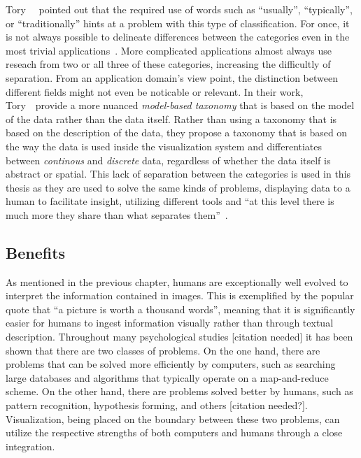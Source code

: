 \noindent Tory~\etal~\cite{tory2002model} pointed out that the required use of words such as ``usually'', ``typically'', or ``traditionally'' hints at a problem with this type of classification.  For once, it is not always possible to delineate differences between the categories even in the most trivial applications~\cite{rhyne2003information, weiskopf2006scivis}.  More complicated applications almost always use reseach from two or all three of these categories, increasing the difficultly of separation.  From an application domain's view point, the distinction between different fields might not even be noticable or relevant.  In their work, Tory~\etal~provide a more nuanced \emph{model-based taxonomy} that is based on the model of the data rather than the data itself.  Rather than using a taxonomy that is based on the description of the data, they propose a taxonomy that is based on the way the data is used inside the visualization system and differentiates between \emph{continous} and \emph{discrete} data, regardless of whether the data itself is abstract or spatial.  This lack of separation between the categories is used in this thesis as they are used to solve the same kinds of problems, displaying data to a human to facilitate insight, utilizing different tools and ``at this level there is much more they share than what separates them''~\cite{van2005value}.

\subsection{Benefits} \label{cha:intro:vis:benefits}
As mentioned in the previous chapter, humans are exceptionally well evolved to interpret the information contained in images.  This is exemplified by the popular quote that ``a picture is worth a thousand words'', meaning that it is significantly easier for humans to ingest information visually rather than through textual description.  Throughout many psychological studies [citation needed] it has been shown that there are two classes of problems.  On the one hand, there are problems that can be solved more efficiently by computers, such as searching large databases and algorithms that typically operate on a map-and-reduce scheme.  On the other hand, there are problems solved better by humans, such as pattern recognition, hypothesis forming, and others [citation needed?].  Visualization, being placed on the boundary between these two problems, can utilize the respective strengths of both computers and humans through a close integration.

